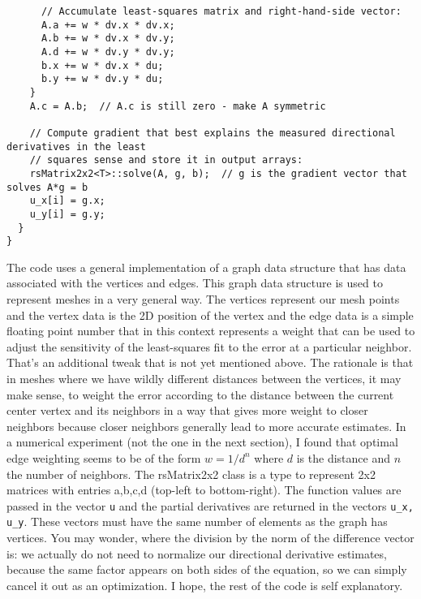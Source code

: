 \begin{lstlisting}
      // Accumulate least-squares matrix and right-hand-side vector:
      A.a += w * dv.x * dv.x;
      A.b += w * dv.x * dv.y;
      A.d += w * dv.y * dv.y;
      b.x += w * dv.x * du;
      b.y += w * dv.y * du;
    }
    A.c = A.b;  // A.c is still zero - make A symmetric

    // Compute gradient that best explains the measured directional derivatives in the least 
    // squares sense and store it in output arrays:
    rsMatrix2x2<T>::solve(A, g, b);  // g is the gradient vector that solves A*g = b
    u_x[i] = g.x;
    u_y[i] = g.y;
  }
}
\end{lstlisting}

The code uses a general implementation of a graph data structure that has data associated with the vertices and edges. This graph data structure is used to represent meshes in a very general way. The vertices represent our mesh points and the vertex data is the 2D position of the vertex and the edge data is a simple floating point number that in this context represents a weight that can be used to adjust the sensitivity of the least-squares fit to the error at a particular neighbor. That's an additional tweak that is not yet mentioned above. The rationale is that in meshes where we have wildly different distances between the vertices, it may make sense, to weight the error according to the distance between the current center vertex and its neighbors in a way that gives more weight to closer neighbors because closer neighbors generally lead to more accurate estimates. In a numerical experiment (not the one in the next section), I found that optimal edge weighting seems to be of the form $w = 1 / d^n$ where $d$ is the distance and $n$ the number of neighbors. The rsMatrix2x2 class is a type to represent 2x2 matrices with entries a,b,c,d (top-left to bottom-right). The function values are passed in the vector \texttt{u} and the partial derivatives are returned in the vectors  \texttt{u\_x, u\_y}. These vectors must have the same number of elements as the graph has vertices. You may wonder, where the division by the norm of the difference vector is: we actually do not need to normalize our directional derivative estimates, because the same factor appears on both sides of the equation, so we can simply cancel it out as an optimization. I hope, the rest of the code is self explanatory.


